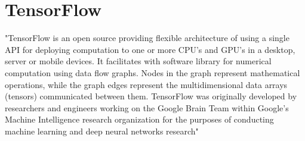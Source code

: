 \section{TensorFlow}

"TensorFlow is an open source providing flexible architecture of using a single API for deploying
computation to one or more CPU’s and GPU’s in a desktop, server or mobile devices. It facilitates
with software library for numerical computation using data flow graphs. Nodes in the graph represent
mathematical operations, while the graph edges represent the multidimensional data arrays (tensors)
communicated between them. TensorFlow was originally developed by researchers and engineers working
on the Google Brain Team within Google's Machine Intelligence research organization for the 
purposes of conducting machine learning and deep neural networks research"~\cite{TensorFlow}